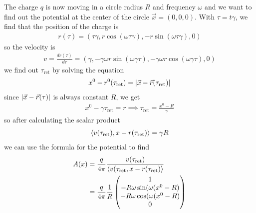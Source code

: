 \begin{ex}
  The charge $q$ is now moving in a circle radius $R$ and frequency $\omega$ and we want to find out the potential at the center of the circle $\vec{x} = (0,0,0)$.
  With $\tau =  t \gamma$, we find that the position of the charge is
  \begin{align*}
    r(\tau) = (\tau \gamma, r \cos(\omega \tau \gamma), - r \sin(\omega \tau \gamma),0)
  \end{align*}
  so the velocity is
  \begin{align*}
    v = \frac{d r(\tau)}{d \tau} = 
    (\gamma, - \gamma \omega r \sin(\omega \gamma \tau),
    - \gamma \omega r \cos(\omega \gamma \tau), 0)
  \end{align*}
  we find out $\tau_{\text{ret}}$ by solving the equation
  \begin{align*}
    x^{0} - r^{0}(\tau_{\text{ret}}) = \vert\vec{x} - \vec{r}(\tau_{\text{ret}})\vert
  \end{align*}
since $\vert\vec{x} - \vec{r}(\tau)\vert$ is always constant $R$,  we get
  \begin{align*}
    x^{0} - \gamma \tau_{\text{ret}} = r \implies \tau_{\text{ret}} = \frac{x^{0} - R}{\gamma}
  \end{align*}
  so after calculating the scalar product
  \begin{align*}
    \langle v(\tau_{\text{ret}}), x - r(\tau_{\text{ret}})\rangle = \gamma R
  \end{align*}
  we can use the formula for the potential to find
  \begin{align*}
    A(x) 
    &= \frac{q}{4 \pi}\frac{v(\tau_{\text{ret}})}{\langle v(\tau_{\text{ret}}, x - r(\tau_{\text{ret}})\rangle}\\
    &= \frac{q}{4 \pi}\frac{1}{R} \begin{pmatrix}
    1\\
    - R\omega\sin(\omega(x^{0}- R) \\
    - R\omega\cos(\omega(x^{0}- R)\\
    0
    \end{pmatrix}
  \end{align*}
\end{ex}

